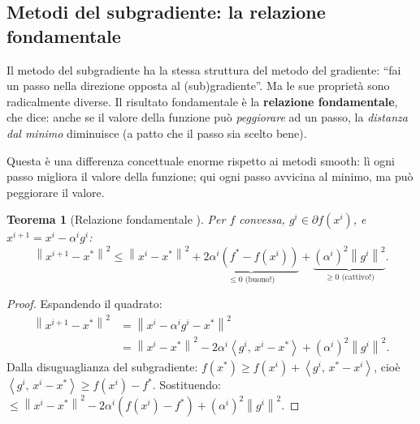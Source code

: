\documentclass[a4paper,11pt]{article}
\newtheorem{theorem}{Teorema}[section]
\theoremstyle{definition}
\newcommand{\norm}[1]{\left\lVert #1 \right\rVert}
\newcommand{\inner}[2]{\left\langle #1,\, #2 \right\rangle}
\begin{document}
\subsection{Metodi del subgradiente: la relazione fondamentale}
\label{subsec:subgradient_methods}

\begin{intuizione}
Il metodo del subgradiente ha la stessa struttura del metodo del gradiente: ``fai un passo nella direzione opposta al (sub)gradiente''. Ma le sue proprietà sono radicalmente diverse. Il risultato fondamentale è la \textbf{relazione fondamentale}, che dice: anche se il valore della funzione può \emph{peggiorare} ad un passo, la \emph{distanza dal minimo} diminuisce (a patto che il passo sia scelto bene).

Questa è una differenza concettuale enorme rispetto ai metodi smooth: lì ogni passo migliora il valore della funzione; qui ogni passo avvicina al minimo, ma può peggiorare il valore.
\end{intuizione}

\begin{theorem}[Relazione fondamentale {\cite[slide~10, set~5]{opt-slides}}]
Per $f$ convessa, $g^i \in \partial f(x^i)$, e $x^{i+1} = x^i - \alpha^i g^i$:
\begin{equation}\label{eq:fundamental}
  \norm{x^{i+1} - x^*}^2 \leq \norm{x^i - x^*}^2 + \underbrace{2\alpha^i(f^* - f(x^i))}_{\leq 0 \text{ (buono!)}} + \underbrace{(\alpha^i)^2\norm{g^i}^2}_{\geq 0 \text{ (cattivo!)}}.
\end{equation}
\end{theorem}

\begin{proof}
Espandendo il quadrato:
\begin{align*}
  \norm{x^{i+1}-x^*}^2 &= \norm{x^i - \alpha^ig^i - x^*}^2 \\
  &= \norm{x^i-x^*}^2 - 2\alpha^i\inner{g^i}{x^i-x^*} + (\alpha^i)^2\norm{g^i}^2.
\end{align*}
Dalla disuguaglianza del subgradiente: $f(x^*) \geq f(x^i) + \inner{g^i}{x^*-x^i}$, cioè $\inner{g^i}{x^i-x^*} \geq f(x^i) - f^*$. Sostituendo: $\leq \norm{x^i-x^*}^2 - 2\alpha^i(f(x^i)-f^*) + (\alpha^i)^2\norm{g^i}^2$.
\end{proof}
\end{document}
